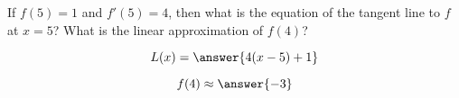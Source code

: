 \documentclass{ximera}
\author{Steven Gubkin}
\begin{document}
\begin{exercise}
If $f(5)=1$ and $f'(5) = 4$, then what is the equation of the tangent
line to $f$ at $x=5$?  What is the linear approximation of $f(4)$?

\begin{prompt}
  $$L(x) = \answer{4(x-5)+1}$$
  
  $$f(4) \approx \answer{-3}$$
\end{prompt}



\end{exercise}
\end{document}
